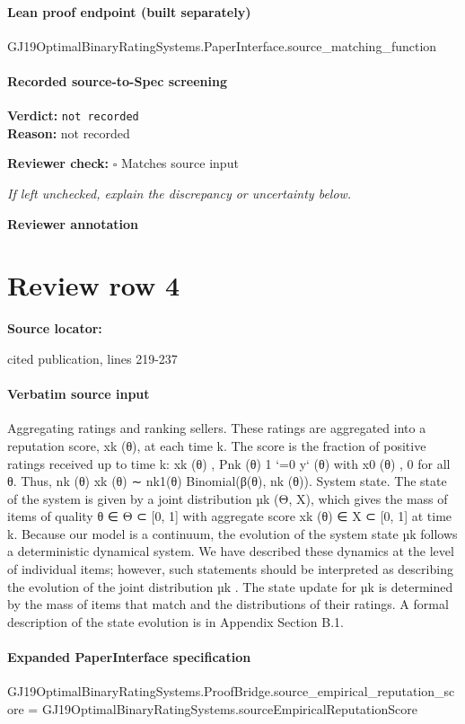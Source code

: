 \documentclass[10pt]{article}
\newcommand{\reviewerbox}{%
  \par\noindent\fbox{\parbox{0.96\linewidth}{\rule{0pt}{0.38in}}}\par
}
\newcommand{\reviewmatch}[1]{%
  \par\noindent\textbf{Reviewer check:} $\square$\; #1\par
  \noindent\emph{If left unchecked, explain the discrepancy or uncertainty below.}\par
}
\begin{document}
\paragraph{Lean proof endpoint (built separately)}\begin{ReviewVerbatim}
GJ19OptimalBinaryRatingSystems.PaperInterface.source_matching_function
\end{ReviewVerbatim}

\paragraph{Recorded source-to-Spec screening}
\textbf{Verdict:} \texttt{not recorded}
\\
\textbf{Reason:} not recorded
\reviewmatch{Matches source input}
\noindent\textbf{Reviewer annotation}\par
\reviewerbox
\clearpage
\hypertarget{source-claim-ad2abdefec264024}{}
\section*{Review row 4}
\textbf{Source locator:} {\footnotesize\raggedright cited publication, lines 219-\allowbreak{}237\par}
\paragraph{Verbatim source input}
\begin{ReviewVerbatim}
Aggregating ratings and ranking sellers.
These ratings are aggregated into a reputation score,
xk (θ), at each time k. The score is the fraction
of positive ratings received up to time k: xk (θ) ,
Pnk (θ)
1
`=0 y` (θ) with x0 (θ) , 0 for all θ. Thus,
nk (θ)
xk (θ) ∼ nk1(θ) Binomial(β(θ), nk (θ)).
System state. The state of the system is given by a
joint distribution µk (Θ, X), which gives the mass of
items of quality θ ∈ Θ ⊂ [0, 1] with aggregate score
xk (θ) ∈ X ⊂ [0, 1] at time k. Because our model is
a continuum, the evolution of the system state µk
follows a deterministic dynamical system.
We have described these dynamics at the level of individual items; however, such statements should be
interpreted as describing the evolution of the joint
distribution µk . The state update for µk is determined by the mass of items that match and the distributions of their ratings. A formal description of
the state evolution is in Appendix Section B.1.
\end{ReviewVerbatim}


\paragraph{Expanded PaperInterface specification}
\begin{ReviewVerbatim}
GJ19OptimalBinaryRatingSystems.ProofBridge.source_empirical_reputation_score =
  GJ19OptimalBinaryRatingSystems.sourceEmpiricalReputationScore
\end{ReviewVerbatim}
\end{document}
